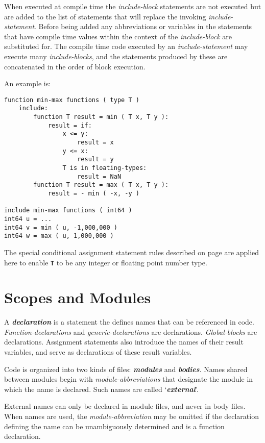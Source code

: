 \documentclass[12pt]{article}
\newcommand{\TT}[1]{{\tt \bfseries #1}}
\newcommand{\key}[1]{{\bf \em #1}\index{#1}}
\newcommand{\skey}[2]{{\bf \em #1#2}\index{#1}}
\newcommand{\ikey}[2]{{\bf \em #1}\index{#2}}
\newenvironment{indpar}[1][0.3in]%
	{\begin{list}{}%
		     {\setlength{\itemsep}{0in}%
		      \setlength{\topsep}{0in}%
		      \setlength{\parsep}{1ex}%
		      \setlength{\labelwidth}{#1}%
		      \setlength{\leftmargin}{#1}%
		      \addtolength{\leftmargin}{\labelsep}}%
	 \item}%
	{\end{list}}
\begin{document}
When executed at compile time the {\em include-block} statements
are not executed but are added to the list of statements that
will replace the invoking {\em include-statement}.  Before being
added any abbreviations or variables in the statements that have
compile time values within the context of the {\em include-block}
are substituted for.  The compile time code executed by an
{\em include-statement} may execute many {\em include-blocks},
and the statements produced by these are concatenated in the
order of block execution.

An example is:
\begin{indpar}\begin{verbatim}
function min-max functions ( type T )
    include:
        function T result = min ( T x, T y ):
            result = if:
                x <= y:
                    result = x
                y <= x:
                    result = y
                T is in floating-types:
                    result = NaN
        function T result = max ( T x, T y ):
            result = - min ( -x, -y )

include min-max functions ( int64 )
int64 u = ...
int64 v = min ( u, -1,000,000 )
int64 w = max ( u, 1,000,000 )
\end{verbatim}\end{indpar}

The special conditional assignment statement
rules described on page \pageref{CONDITIONAL-SPECIAL-RULES}
are applied here to enable \TT{T} to be any integer or
floating point number type.

\section{Scopes and Modules}
\label{SCOPES-AND-MODULES}

A \key{declaration} is a statement the defines names that
can be referenced in code.  {\em Function-declara\-tions}
and {\em generic-declarations} are declarations.
{\em Global-blocks} are declarations.
Assignment statements also
introduce the names of their result variables, and serve
as declarations of these result variables.

Code is organized into two kinds of files: \skey{module}s
and \ikey{bodies}{body}.  Names shared
between modules begin with {\em module-abbreviations}
that designate the module in which the name is declared.
Such names are called `\key{external}'.

External names can only be declared in module files, and
never in body files.
When names are used, the {\em module-abbreviation} may
be omitted if the declaration defining the name can be
unambiguously determined and is a function declaration.
\end{document}
